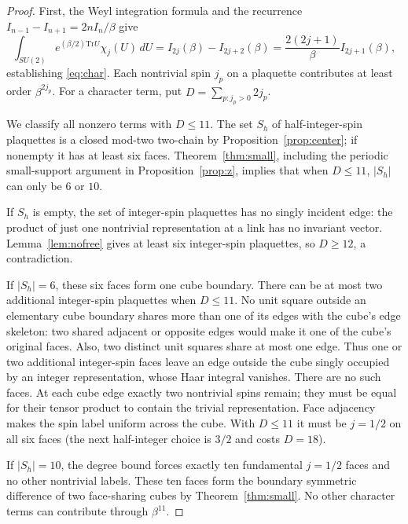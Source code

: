 \documentclass[11pt,a4paper]{article}
\begin{document}
\begin{proof}
First, the Weyl integration formula and the recurrence
$I_{n-1}-I_{n+1}=2nI_n/\beta$ give
\[
\int_{SU(2)}e^{(\beta/2)\mathrm{Tr}U}\chi_j(U)\,dU
 =I_{2j}(\beta)-I_{2j+2}(\beta)
 =\frac{2(2j+1)}{\beta}I_{2j+1}(\beta),
\]
establishing \eqref{eq:char}. Each nontrivial spin $j_p$ on a
plaquette contributes at least order $\beta^{2j_p}$.
For a character term, put $D=\sum_{p:j_p>0}2j_p$.

We classify all nonzero terms with $D\le11$. The set $S_h$ of
half-integer-spin plaquettes is a closed mod-two two-chain by
Proposition~\ref{prop:center}; if nonempty it has at least six faces.
Theorem~\ref{thm:small}, including the periodic small-support
argument in Proposition~\ref{prop:z}, implies that when $D\le11$,
$|S_h|$ can only be $6$ or $10$.

If $S_h$ is empty, the set of integer-spin plaquettes has no singly
incident edge: the product of just one nontrivial representation at a
link has no invariant vector. Lemma~\ref{lem:nofree} gives at least six
integer-spin plaquettes, so $D\ge12$, a contradiction.

If $|S_h|=6$, these six faces form one cube boundary. There can be at
most two additional integer-spin plaquettes when $D\le11$. No unit
square outside an elementary cube boundary shares more than one of
its edges with the cube's edge skeleton: two shared adjacent or
opposite edges would make it one of the cube's original faces.
Also, two distinct unit squares share at most one edge. Thus one or
two additional integer-spin faces leave an edge outside the cube
singly occupied by an integer representation, whose Haar integral
vanishes. There are no such faces. At each cube edge exactly two
nontrivial spins remain; they must be equal for their tensor product
to contain the trivial representation. Face adjacency makes the
spin label uniform across the cube. With $D\le11$ it must be
$j=1/2$ on all six faces (the next half-integer choice is $3/2$ and
costs $D=18$).

If $|S_h|=10$, the degree bound forces exactly ten fundamental
$j=1/2$ faces and no other nontrivial labels. These ten faces form
the boundary symmetric difference of two face-sharing cubes by
Theorem~\ref{thm:small}. No other character terms can contribute
through $\beta^{11}$.


\end{proof}
\end{document}
